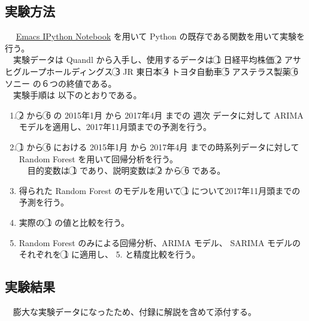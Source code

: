 \documentclass{scrartcl}
\begin{document}
\subsection{実験方法}
\label{sec:orgc221c42}
　 \href{https://github.com/millejoh/emacs-ipython-notebook}{Emacs IPython Notebook} を用いて Python の既存である関数を用いて実験を行う。\\
　実験データは Quandl から入手し、使用するデータは \textcircled{\scriptsize 1} 日経平均株価 \textcircled{\scriptsize 2} アサヒグループホールディングス \textcircled{\scriptsize 3} JR 東日本 \textcircled{\scriptsize 4} トヨタ自動車 \textcircled{\scriptsize 5} アステラス製薬 \textcircled{\scriptsize 6} ソニー の６つの終値である。\\
　実験手順は 以下のとおりである。\\
\begin{enumerate}
\item \textcircled{\scriptsize 2} から \textcircled{\scriptsize 6} の 2015年1月 から 2017年4月 までの 週次 データに対して ARIMA モデルを適用し、2017年11月頭までの予測を行う。\\
\item \textcircled{\scriptsize 1} から \textcircled{\scriptsize 6} における 2015年1月 から 2017年4月 までの時系列データに対して Random Forest を用いて回帰分析を行う。\\
　目的変数は \textcircled{\scriptsize 1} であり、説明変数は \textcircled{\scriptsize 2} から \textcircled{\scriptsize 6} である。\\
\item 得られた Random Forest のモデルを用いて \textcircled{\scriptsize 1} について2017年11月頭までの予測を行う。\\
\item 実際の \textcircled{\scriptsize 1} の値と比較を行う。\\
\item Random Forest のみによる回帰分析、ARIMA モデル、 SARIMA モデルのそれぞれを \textcircled{\scriptsize 1} に適用し、 5. と精度比較を行う。\\
\end{enumerate}
\subsection{実験結果}
\label{sec:org8902258}
　膨大な実験データになったため、付録に解説を含めて添付する。\\
\end{document}
